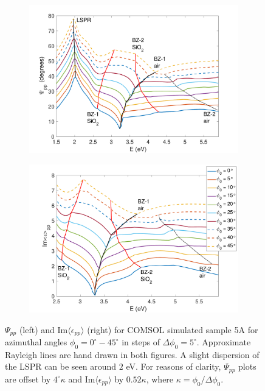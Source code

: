 \begin{figure}[h!] %
    \begin{subfigure}{0.5\textwidth}
        \centering
        \includegraphics[width=\linewidth, trim=1cm 0cm 0cm 0cm, clip]{figures/ch4/S5A/S5A_Psipp_phi=0-45_offset4.pdf}
        \label{}
    \end{subfigure}
    \begin{subfigure}{0.5\textwidth}
        \centering
        \includegraphics[width=\linewidth, trim=1cm 0cm 0cm 0cm, clip]{figures/ch4/S5A/S5A_ImEpsilon_phi=0-45_offset052(2).pdf}
        \label{}
    \end{subfigure}
    \label{fig:S5A_Psi_Imeps_stacked}
    \caption{$\Psi_{pp}$ (left) and Im$\langle\epsilon_{pp}\rangle$ (right) for COMSOL simulated sample 5A for azimuthal angles $\phi_0 = 0^\circ-45^\circ$ in steps of $\Delta\phi_0=5^\circ$. Approximate Rayleigh lines are hand drawn in both figures. A slight dispersion of the LSPR can be seen around $2$ eV. For reasons of clarity, $\Psi_{pp}$ plots are offset by $4^\circ\kappa$ and Im$\langle\epsilon_{pp}\rangle$ by $0.52\kappa$, where $\kappa=\phi_0/\Delta\phi_0$.}
    \label{fig:S5A_stacked_PsippImeps}
\end{figure} 

